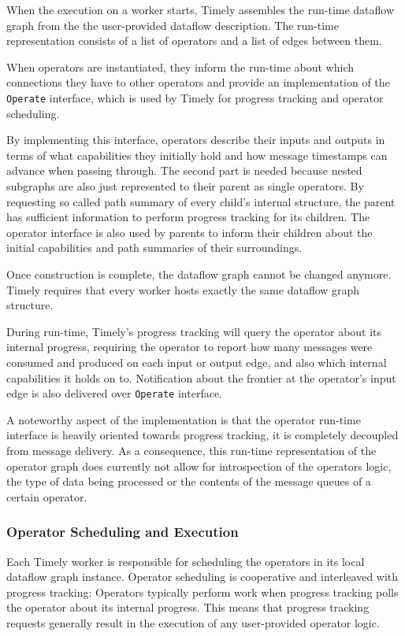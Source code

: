 When the execution on a worker starts, Timely assembles the run-time
dataflow graph from the the user-provided dataflow description. The run-time
representation consists of a list of operators and a list of edges between them.

When operators are instantiated, they inform the run-time about which
connections they have to other operators and provide an implementation
of the \lstinline{Operate} interface, which is used by Timely for progress
tracking and operator scheduling.

By implementing this interface, operators describe their inputs and
outputs in terms of what capabilities they initially hold and how message
timestamps can advance when passing through. The second part is needed because
nested subgraphs are also just represented to their parent as single operators.
By requesting so called path summary of every child's internal structure, the
parent has sufficient information to perform progress tracking for its
children. The operator interface is also used by parents to inform their children
about the initial capabilities and path summaries of their surroundings.

Once construction is complete, the dataflow graph cannot be changed anymore.
Timely requires that every worker hosts exactly the same dataflow graph
structure.

During run-time, Timely's progress tracking will query the operator about its
internal progress, requiring the operator to report how many messages were
consumed and produced on each input or output edge, and also which internal
capabilities it holds on to. Notification about the frontier at the
operator's input edge is also delivered over \lstinline{Operate} interface.

A noteworthy aspect of the implementation is that the operator run-time interface
is heavily oriented towards progress tracking, it is completely decoupled
from message delivery.
As a consequence, this run-time representation of the operator graph does
currently not allow for introspection of the operators logic, the type of data
being processed or the contents of the message queues of a certain operator.

\subsubsection{Operator Scheduling and Execution}

Each Timely worker is responsible for scheduling the operators in its local
dataflow graph instance. Operator scheduling is cooperative and interleaved 
with progress tracking: Operators typically perform work when progress tracking
polls the operator about its internal progress. This means that progress
tracking requests generally result in the execution of any user-provided
operator logic.

